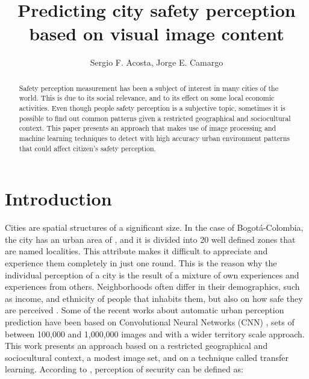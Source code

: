 \documentclass{llncs}
\begin{document}
\title{Predicting city safety perception based on visual image content}



\author{Sergio F. Acosta, Jorge E. Camargo}


\maketitle

\begin{abstract}
Safety perception measurement has been a subject of interest in many cities of the world. This is due to its social relevance, and to its effect on some local economic activities. Even though people safety perception is a subjective topic, sometimes it is possible to find out common patterns given a restricted geographical and sociocultural context. This paper presents an approach that makes use of image processing and machine learning techniques to detect with high accuracy urban environment patterns that could affect citizen's safety perception. 
\end{abstract}













\section{Introduction}
Cities are spatial structures of a significant size. In the case of Bogotá-Colombia, the city has an urban area of  , and it is divided into 20 well defined zones that are named localities.  This attribute makes it difficult to appreciate and experience them completely in just one round. This is the reason why the individual perception of a city is the result of a mixture of own experiences and experiences from others. Neighborhoods often differ in their demographics, such as income, and ethnicity of people that inhabits them, but also on how safe they are perceived \cite{Kominers2015}. Some of the recent works about automatic urban perception prediction have been based on Convolutional Neural Networks (CNN) \cite{Krizhevsky2012}, sets of between 100,000 and 1,000,000 images and with a wider territory scale approach. This work presents an approach based on a restricted geographical and sociocultural context, a modest image set, and on a technique called transfer learning. According to \cite{Gomez2016}, perception of security can be defined as:
\end{document}
